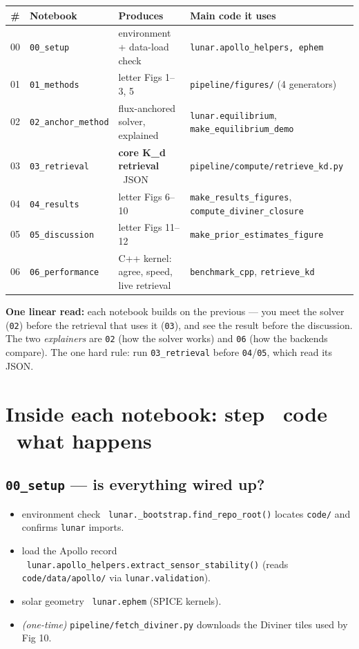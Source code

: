 \documentclass[11pt]{article}
\newcommand{\code}[1]{\texttt{\small #1}}
\newcommand{\fn}[1]{\texttt{\small\color{coral}#1}}
\newcommand{\arr}{\textrightarrow}
\newcommand{\nb}[1]{\texttt{\small\color{forest}#1}}
\begin{document}
\begin{center}\footnotesize
\begin{tabular}{@{}clll@{}}
\toprule
\# & Notebook & Produces & Main code it uses \\
\midrule
00 & \nb{00\_setup}      & environment + data-load check & \code{lunar.apollo\_helpers, ephem} \\
01 & \nb{01\_methods}    & letter Figs 1--3, 5 & \code{pipeline/figures/} (4 generators) \\
02 & \nb{02\_anchor\_method}     & flux-anchored solver, explained & \code{lunar.equilibrium}, \code{make\_equilibrium\_demo} \\
03 & \nb{03\_retrieval}  & \textbf{core K\_d retrieval} \arr\ JSON & \code{pipeline/compute/retrieve\_kd.py} \\
04 & \nb{04\_results}    & letter Figs 6--10 & \code{make\_results\_figures}, \code{compute\_diviner\_closure} \\
05 & \nb{05\_discussion} & letter Figs 11--12 & \code{make\_prior\_estimates\_figure} \\
06 & \nb{06\_performance}& C++ kernel: agree, speed, live retrieval & \code{benchmark\_cpp}, \code{retrieve\_kd} \\
\bottomrule
\end{tabular}
\end{center}

\noindent
\textbf{One linear read:} each notebook builds on the previous --- you meet the
solver (\nb{02}) before the retrieval that uses it (\nb{03}), and see the result
before the discussion. The two \emph{explainers} are \nb{02} (how the solver
works) and \nb{06} (how the backends compare). The one hard rule: run
\nb{03\_retrieval} before \nb{04}/\nb{05}, which read its JSON.

\section{Inside each notebook: step \arr\ code \arr\ what happens}

\subsection{\nb{00\_setup} --- is everything wired up?}
\begin{itemize}
\item environment check \arr\ \fn{lunar.\_bootstrap.find\_repo\_root()} locates \code{code/} and confirms \code{lunar} imports.
\item load the Apollo record \arr\ \fn{lunar.apollo\_helpers.extract\_sensor\_stability()} (reads \code{code/data/apollo/} via \code{lunar.validation}).
\item solar geometry \arr\ \code{lunar.ephem} (SPICE kernels).
\item \emph{(one-time)} \fn{pipeline/fetch\_diviner.py} downloads the Diviner tiles used by Fig 10.
\end{itemize}
\end{document}
